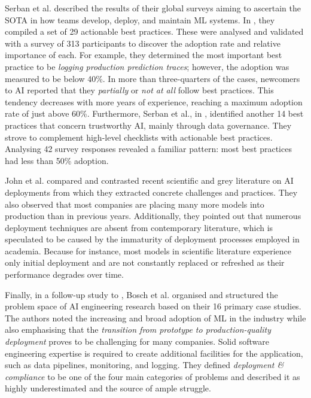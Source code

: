 Serban et al. \cite{serban2020adoption,serban2021practices} described the results of their global surveys aiming to ascertain the SOTA in how teams develop, deploy, and maintain ML systems. In \cite{serban2020adoption}, they compiled a set of 29 actionable best practices. These were analysed and validated with a survey of 313 participants to discover the adoption rate and relative importance of each. For example, they determined the most important best practice to be \textit{logging production prediction traces}; however, the adoption was measured to be below 40\%. In more than three-quarters of the cases, newcomers to AI reported that they \textit{partially} or \textit{not at all} follow best practices. This tendency decreases with more years of experience, reaching a maximum adoption rate of just above 60\%. Furthermore, Serban et al., in \cite{serban2021practices}, identified another 14 best practices that concern trustworthy AI, mainly through data governance. They strove to complement high-level checklists with actionable best practices. Analysing 42 survey responses revealed a familiar pattern: most best practices had less than 50\% adoption.

John et al. \cite{john2020architecting} compared and contrasted recent scientific and grey literature on AI deployments from which they extracted concrete challenges and practices. They also observed that most companies are placing many more models into production than in previous years. Additionally, they pointed out that numerous deployment techniques are absent from contemporary literature, which is speculated to be caused by the immaturity of deployment processes employed in academia. Because for instance, most models in scientific literature experience only initial deployment and are not constantly replaced or refreshed as their performance degrades over time.

Finally, in a follow-up study to \cite{john2020architecting}, Bosch et al. \cite{bosch2021engineering} organised and structured the problem space of AI engineering research based on their 16 primary case studies. The authors noted the increasing and broad adoption of ML in the industry while also emphasising that the \textit{transition from prototype to production-quality deployment} proves to be challenging for many companies. Solid software engineering expertise is required to create additional facilities for the application, such as data pipelines, monitoring, and logging. They defined \textit{deployment \& compliance} to be one of the four main categories of problems and described it as highly underestimated and the source of ample struggle.

